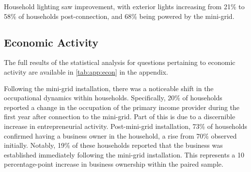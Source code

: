 Household lighting saw improvement, with exterior lights increasing from 21\% to 58\% of households post-connection, and 68\% being powered by the mini-grid.

\subsection{Economic Activity}
The full results of the statistical analysis for questions pertaining to economic activity are available in \cref{tab:app:econ} in the appendix.

Following the mini-grid installation, there was a noticeable shift in the occupational dynamics within households. Specifically, 20\% of households reported a change in the occupation of the primary income provider during the first year after connection to the mini-grid. Part of this is due to a discernible increase in entrepreneurial activity. Post-mini-grid installation, 73\% of households confirmed having a business owner in the household, a rise from 70\% observed initially. Notably, 19\% of these households reported that the business was established immediately following the mini-grid installation. This represents a 10 percentage-point increase in business ownership within the paired sample.

